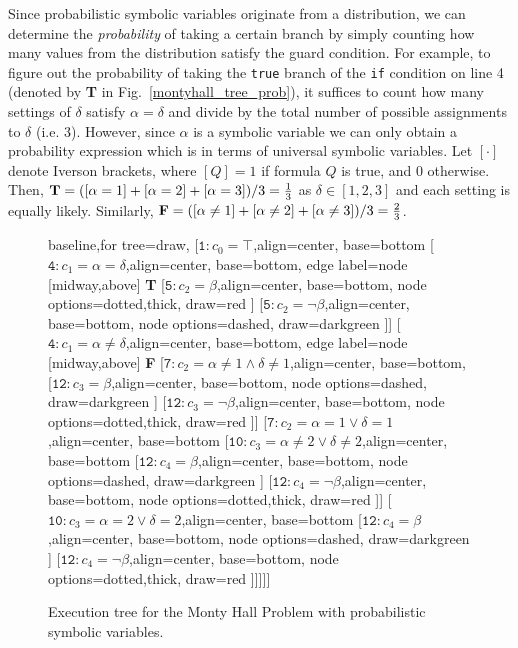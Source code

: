 \documentclass[acmsmall,review]{acmart}\settopmatter{}
\begin{document}
	
	Since probabilistic symbolic variables originate from a distribution, we can determine the \textit{probability} of taking a certain branch by simply counting how many values from the distribution satisfy the guard condition.
	For example, to figure out the probability of taking the \texttt{true} branch of the \texttt{if} condition on line 4 (denoted by \textbf{T} in Fig.~\ref{montyhall_tree_prob}), it suffices to count how many settings of $\delta$ satisfy $\alpha = \delta$ and divide by the total number of possible assignments to $\delta$ (i.e. 3).
	However, since $\alpha$ is a symbolic variable we can only obtain a probability expression which is in terms of universal symbolic variables.
	Let $[\cdot]$ denote Iverson brackets, where $[Q]=1$ if formula $Q$ is true, and 0 otherwise.
	Then, $\text{\textbf{T}} = ([\alpha = 1] + [\alpha = 2] + [\alpha = 3])/3 = \frac{1}{3}$ as $\delta \in [1,2,3]$ and each setting is equally likely.
	Similarly, $\text{\textbf{F}} = ([\alpha \neq 1] + [\alpha \neq 2] + [\alpha \neq 3])/3 = \frac{2}{3}$.
	
	
	\begin{figure}
		\label{fig:montyhall_tree_prob}
		\centering
		{\footnotesize
			\begin{forest}baseline,for tree=draw,
				[{$\mathtt{1}: c_0=\top$},align=center, base=bottom
				[{$\mathtt{4}: c_1 = \alpha = \delta$},align=center, base=bottom, edge label={node [midway,above] {\textbf{T}} }
				[{$\mathtt{5}: c_2 = \beta$},align=center, base=bottom, node options={dotted,thick}, draw=red ] %
				[{$\mathtt{5}: c_2 =  \neg\beta$},align=center, base=bottom, node options={dashed}, draw=darkgreen ]] %
				[{$\mathtt{4}: c_1 = \alpha \neq \delta$},align=center, base=bottom, edge label={node [midway,above] {\textbf{F}} }
				[{$\mathtt{7}: c_2 = \alpha \neq 1 \wedge \delta \neq 1$},align=center, base=bottom, 
				[{$\mathtt{12}: c_3 = \beta$},align=center, base=bottom, node options={dashed}, draw=darkgreen ] %
				[{$\mathtt{12}: c_3 = \neg\beta$},align=center, base=bottom, node options={dotted,thick}, draw=red ]] %
				[{$\mathtt{7}: c_2 = \alpha = 1 \vee \delta = 1$},align=center, base=bottom
				[{$\mathtt{10}: c_3 = \alpha \neq 2 \vee \delta \neq 2$},align=center, base=bottom
				[{$\mathtt{12}: c_4 = \beta$},align=center, base=bottom, node options={dashed}, draw=darkgreen ] %
				[{$\mathtt{12}: c_4 = \neg\beta$},align=center, base=bottom, node options={dotted,thick}, draw=red ]] %
				[{$\mathtt{10}: c_3 = \alpha = 2 \vee \delta = 2$},align=center, base=bottom
				[{$\mathtt{12}: c_4 = \beta$},align=center, base=bottom, node options={dashed}, draw=darkgreen ]%
				[{$\mathtt{12}: c_4 = \neg\beta$},align=center, base=bottom, node options={dotted,thick}, draw=red ]]]]] %
			\end{forest}
		}
		\caption{Execution tree for the Monty Hall Problem with probabilistic symbolic variables.}
	\end{figure}
	
\end{document}

